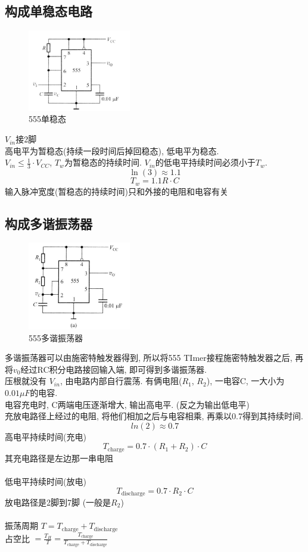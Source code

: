 \documentclass[scheme=chinese,a4paper]{report}
\begin{document}
\subsection{构成单稳态电路}
\begin{figure}[H]
    \centering
    \includegraphics[width=0.4\textwidth]{555_mono.png}
    \caption{555单稳态}
    \end{figure}
$V_{in}$接2脚\\
高电平为暂稳态(持续一段时间后掉回稳态), 低电平为稳态. \\
$V_{in} \leq \frac{1}{3}\cdot V_{CC}$, $T_w$为暂稳态的持续时间. $V_{in}$的低电平持续时间必须小于$T_w$. 
$$\ln(3)\approx 1.1$$
$$ T_w=1.1R\cdot   C $$
输入脉冲宽度(暂稳态的持续时间)只和外接的电阻和电容有关
\subsection{构成多谐振荡器}
\begin{figure}[H]
    \centering
    \includegraphics[width=0.4\textwidth]{555_multivibrator.png}
    \caption{555多谐振荡器}
    \end{figure}
多谐振荡器可以由施密特触发器得到, 所以将555 TImer接程施密特触发器之后, 再将$v_0$经过RC积分电路接回输入端, 即可得到多谐振荡器. \\
压根就没有 $ V_{in} $, 由电路内部自行震荡. 有俩电阻($R_1$, $R_2$), 一电容C, 一大小为$0.01\mu F$的电容. \\
电容充电时, C两端电压逐渐增大, 输出高电平. (反之为输出低电平)\\
充放电路径上经过的电阻, 将他们相加之后与电容相乘, 再乘以0.7得到其持续时间. \\
$$ln(2) \approx 0.7$$
高电平持续时间(充电) $$T_{\text{charge}}=0.7\cdot(R_1+R_2)\cdot C$$ 其充电路径是左边那一串电阻\\ \\
低电平持续时间(放电) $$T_{\text{discharge}}=0.7\cdot R_2\cdot C$$ 放电路径是2脚到7脚 (一般是$R_2$)\\ \\
振荡周期 $T=T_{\text{charge}}+T_{\text{discharge}}$\\
占空比 $= \frac{T_H}{T}=\frac{T_{\text{charge}}}{T_{\text{charge}}+T_{\text{discharge}}}$
\end{document}
